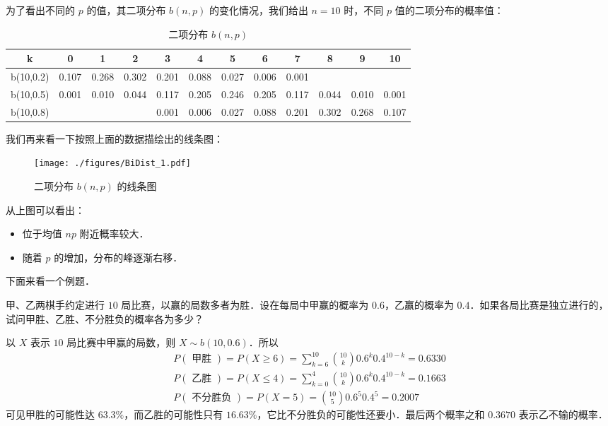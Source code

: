 为了看出不同的 $p $ 的值，其二项分布 $b(n ,p) $ 的变化情况，我们给出 $n=10$ 时，不同 $p $ 值的二项分布的概率值：
\begin{table}[ht]
\centering
\caption{二项分布 $b(n, p)$}\label{BiDist_tab1}
\begin{tabular}{|c|c|c|c|c|c|c|c|c|c|c|c|}
\hline
k & 0 & 1 & 2 & 3 & 4 & 5 & 6 & 7 & 8 & 9 & 10 \\
\hline
b(10,0.2) & 0.107 & 0.268 & 0.302 & 0.201 & 0.088 & 0.027 & 0.006 & 0.001 & & & \\
\hline
b(10,0.5) & 0.001 & 0.010 & 0.044 & 0.117 & 0.205 & 0.246 & 0.205 & 0.117 & 0.044 & 0.010 & 0.001 \\
\hline
b(10,0.8) & & & & 0.001 & 0.006 & 0.027 & 0.088 & 0.201 & 0.302 & 0.268 & 0.107 \\
\hline
\end{tabular}
\end{table}
我们再来看一下按照上面的数据描绘出的线条图：
\begin{figure}[ht]
\centering
\texttt{[image: ./figures/BiDist\_1.pdf]}
\caption{二项分布 $b(n,p)$ 的线条图} \label{BiDist_fig1}
\end{figure}

从上图可以看出：
\begin{itemize}
\item 位于均值 $np$ 附近概率较大．
\item 随着 $p $ 的增加，分布的峰逐渐右移．
\end{itemize}

下面来看一个例题．
\begin{example}{}
甲、乙两棋手约定进行 $10 $ 局比赛，以赢的局数多者为胜．设在每局中甲赢的概率为 $0.6$，乙赢的概率为 $0. 4$．如果各局比赛是独立进行的，试问甲胜、乙胜、不分胜负的概率各为多少？

以 $X $ 表示 $10 $ 局比赛中甲赢的局数，则 $X\sim b(10,0. 6)$．所以
\begin{equation}
\begin{aligned}P(\text { 甲胜 })=P(X \geqslant 6)=\sum_{k=6}^{10}\binom{10}{k} 0.6^{k} 0.4^{10-k}=0.6330 \\ P(\text { 乙胜 })=P(X \leqslant 4)=\sum_{k=0}^{4}\binom{10}{k} 0.6^{k} 0.4^{10-k}=0.1663 \\ P(\text { 不分胜负 })=P(X=5)=\binom{10}{5} 0.6^{5} 0.4^{5}=0.2007\end{aligned}
\end{equation}
可见甲胜的可能性达 $63. 3\%$，而乙胜的可能性只有 $16. 63\% $，它比不分胜负的可能性还要小．最后两个概率之和 $0. 367 0 $ 表示乙不输的概率．
\end{example}